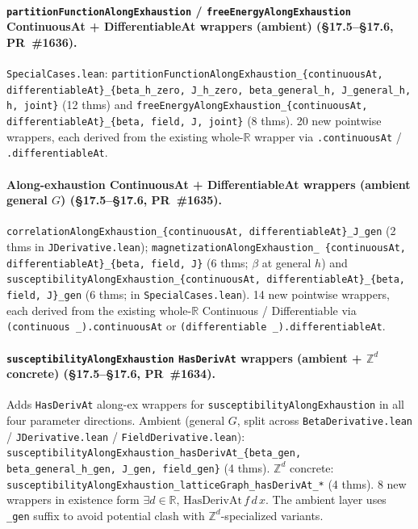 \documentclass[a4paper,11pt]{article}
\begin{document}
\paragraph{\texttt{partitionFunctionAlongExhaustion} /
\texttt{freeEnergyAlongExhaustion} ContinuousAt + DifferentiableAt
wrappers (ambient)
(\S17.5--\S17.6, PR~\#1636).}
\texttt{SpecialCases.lean}:
\texttt{partitionFunctionAlongExhaustion\_\{continuousAt,
differentiableAt\}\_\{beta\_h\_zero, J\_h\_zero,
beta\_general\_h, J\_general\_h, h, joint\}} (12 thms) and
\texttt{freeEnergyAlongExhaustion\_\{continuousAt,
differentiableAt\}\_\{beta, field, J, joint\}} (8 thms). 20 new
pointwise wrappers, each derived from the existing whole-$\mathbb{R}$
wrapper via \texttt{.continuousAt} / \texttt{.differentiableAt}.

\paragraph{Along-exhaustion ContinuousAt + DifferentiableAt
wrappers (ambient general $G$)
(\S17.5--\S17.6, PR~\#1635).}
\texttt{correlationAlongExhaustion\_\{continuousAt,
differentiableAt\}\_J\_gen} (2 thms in
\texttt{JDerivative.lean}); \texttt{magnetizationAlongExhaustion\_
\{continuousAt, differentiableAt\}\_\{beta, field, J\}} (6 thms;
$\beta$ at general $h$) and
\texttt{susceptibilityAlongExhaustion\_\{continuousAt,
differentiableAt\}\_\{beta, field, J\}\_gen} (6 thms; in
\texttt{SpecialCases.lean}). 14 new pointwise wrappers, each
derived from the existing whole-$\mathbb{R}$ Continuous /
Differentiable via \texttt{(continuous \_).continuousAt} or
\texttt{(differentiable \_).differentiableAt}.

\paragraph{\texttt{susceptibilityAlongExhaustion} \texttt{HasDerivAt}
wrappers (ambient + $\mathbb{Z}^d$ concrete)
(\S17.5--\S17.6, PR~\#1634).} Adds \texttt{HasDerivAt} along-ex
wrappers for \texttt{susceptibilityAlongExhaustion} in all four
parameter directions. Ambient (general $G$, split across
\texttt{BetaDerivative.lean} / \texttt{JDerivative.lean} /
\texttt{FieldDerivative.lean}):
\texttt{susceptibilityAlongExhaustion\_hasDerivAt\_\{beta\_gen,
beta\_general\_h\_gen, J\_gen, field\_gen\}} (4 thms).
$\mathbb{Z}^d$ concrete:
\texttt{susceptibilityAlongExhaustion\_latticeGraph\_hasDerivAt\_*}
(4 thms). 8 new wrappers in existence form
$\exists d \in \mathbb{R},\,\mathrm{HasDerivAt}\,f\,d\,x$. The
ambient layer uses \texttt{\_gen} suffix to avoid potential clash
with $\mathbb{Z}^d$-specialized variants.
\end{document}
